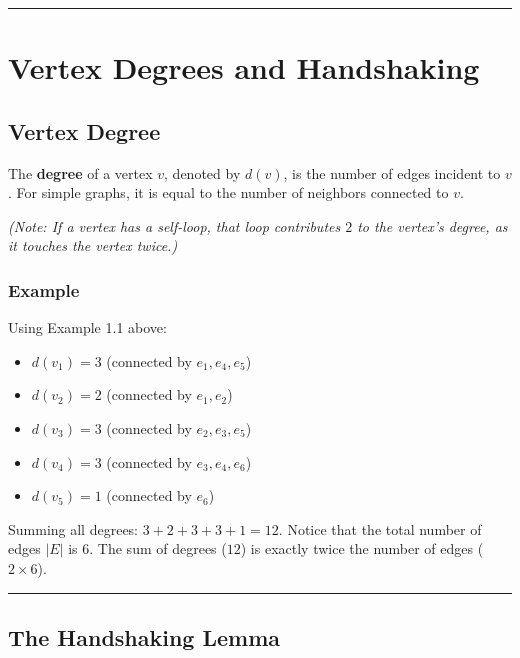 \documentclass[
]{book}
\providecommand{\tightlist}{%
  \setlength{\itemsep}{0pt}\setlength{\parskip}{0pt}}
\theoremstyle{definition}
\theoremstyle{definition}
\theoremstyle{definition}
\theoremstyle{definition}
\theoremstyle{remark}
\begin{document}
\begin{center}\rule{0.5\linewidth}{0.5pt}\end{center}

\section{Vertex Degrees and Handshaking}\label{vertex-degrees-and-handshaking}

\subsection{Vertex Degree}\label{vertex-degree}

The \textbf{degree} of a vertex \(v\), denoted by \(d(v)\), is the number of edges incident to \(v\). For simple graphs, it is equal to the number of neighbors connected to \(v\).

\emph{(Note: If a vertex has a self-loop, that loop contributes \(2\) to the vertex's degree, as it touches the vertex twice.)}

\subsubsection{Example}\label{example-1}

Using Example 1.1 above:

\begin{itemize}
\tightlist
\item
  \(d(v_1) = 3\) (connected by \(e_1, e_4, e_5\))
\item
  \(d(v_2) = 2\) (connected by \(e_1, e_2\))
\item
  \(d(v_3) = 3\) (connected by \(e_2, e_3, e_5\))
\item
  \(d(v_4) = 3\) (connected by \(e_3, e_4, e_6\))
\item
  \(d(v_5) = 1\) (connected by \(e_6\))
\end{itemize}

Summing all degrees: \(3 + 2 + 3 + 3 + 1 = 12\). Notice that the total number of edges \(\vert{}E\vert{}\) is \(6\). The sum of degrees (\(12\)) is exactly twice the number of edges (\(2 \times 6\)).

\begin{center}\rule{0.5\linewidth}{0.5pt}\end{center}

\subsection{The Handshaking Lemma}\label{the-handshaking-lemma}
\end{document}
